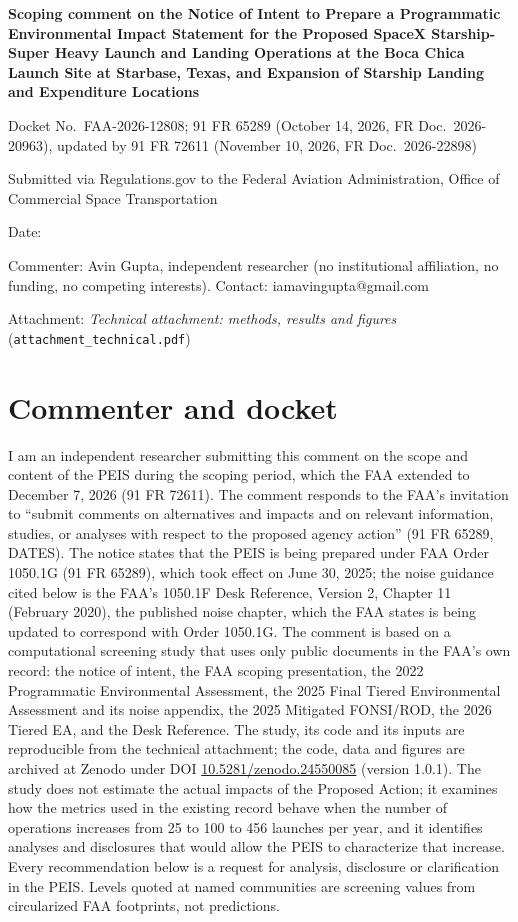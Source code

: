 \documentclass[11pt]{article}
\begin{document}
{  \raggedright
\noindent\textbf{Scoping comment on the Notice of Intent to Prepare a Programmatic Environmental Impact Statement for the Proposed SpaceX Starship-Super Heavy Launch and Landing Operations at the Boca Chica Launch Site at Starbase, Texas, and Expansion of Starship Landing and Expenditure Locations}\par}

\noindent Docket No.\ FAA-2026-12808; 91 FR 65289 (October 14, 2026, FR Doc.\ 2026-20963), updated by 91 FR 72611 (November 10, 2026, FR Doc.\ 2026-22898)

\noindent Submitted via Regulations.gov to the Federal Aviation Administration, Office of Commercial Space Transportation

\noindent Date: \commentDate

\noindent Commenter: Avin Gupta, independent researcher (no institutional affiliation, no funding, no competing interests). Contact: iamavingupta@gmail.com

\noindent Attachment: \textit{Technical attachment: methods, results and figures} (\texttt{attachment\_technical.pdf})

\section{Commenter and docket}

I am an independent researcher submitting this comment on the scope and content of the PEIS during the scoping period, which the FAA extended to December 7, 2026 (91 FR 72611). The comment responds to the FAA's invitation to ``submit comments on alternatives and impacts and on relevant information, studies, or analyses with respect to the proposed agency action'' (91 FR 65289, DATES). The notice states that the PEIS is being prepared under FAA Order 1050.1G (91 FR 65289), which took effect on June 30, 2025; the noise guidance cited below is the FAA's 1050.1F Desk Reference, Version 2, Chapter 11 (February 2020), the published noise chapter, which the FAA states is being updated to correspond with Order 1050.1G. The comment is based on a computational screening study that uses only public documents in the FAA's own record: the notice of intent, the FAA scoping presentation, the 2022 Programmatic Environmental Assessment, the 2025 Final Tiered Environmental Assessment and its noise appendix, the 2025 Mitigated FONSI/ROD, the 2026 Tiered EA, and the Desk Reference. The study, its code and its inputs are reproducible from the technical attachment; the code, data and figures are archived at Zenodo under DOI \href{https://doi.org/10.5281/zenodo.24550085}{10.5281/zenodo.24550085} (version 1.0.1). The study does not estimate the actual impacts of the Proposed Action; it examines how the metrics used in the existing record behave when the number of operations increases from 25 to 100 to 456 launches per year, and it identifies analyses and disclosures that would allow the PEIS to characterize that increase. Every recommendation below is a request for analysis, disclosure or clarification in the PEIS. Levels quoted at named communities are screening values from circularized FAA footprints, not predictions.
\end{document}
